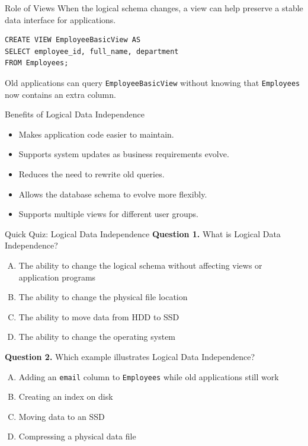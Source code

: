 \documentclass[aspectratio=169,11pt]{beamer}
\begin{document}
\begin{frame}[fragile]{Role of Views}
When the logical schema changes, a view can help preserve a stable data interface for applications.

\begin{lstlisting}[style=sqlstyle]
CREATE VIEW EmployeeBasicView AS
SELECT employee_id, full_name, department
FROM Employees;
\end{lstlisting}

Old applications can query \texttt{EmployeeBasicView} without knowing that \texttt{Employees} now contains an extra column.
\end{frame}

\begin{frame}{Benefits of Logical Data Independence}
\begin{itemize}
  \item Makes application code easier to maintain.
  \item Supports system updates as business requirements evolve.
  \item Reduces the need to rewrite old queries.
  \item Allows the database schema to evolve more flexibly.
  \item Supports multiple views for different user groups.
\end{itemize}
\end{frame}

\begin{frame}{Quick Quiz: Logical Data Independence}
\textbf{Question 1.} What is Logical Data Independence?
\begin{enumerate}[A.]
  \item The ability to change the logical schema without affecting views or application programs
  \item The ability to change the physical file location
  \item The ability to move data from HDD to SSD
  \item The ability to change the operating system
\end{enumerate}

\vspace{0.2cm}
\textbf{Question 2.} Which example illustrates Logical Data Independence?
\begin{enumerate}[A.]
  \item Adding an \texttt{email} column to \texttt{Employees} while old applications still work
  \item Creating an index on disk
  \item Moving data to an SSD
  \item Compressing a physical data file
\end{enumerate}
\end{frame}
\end{document}
